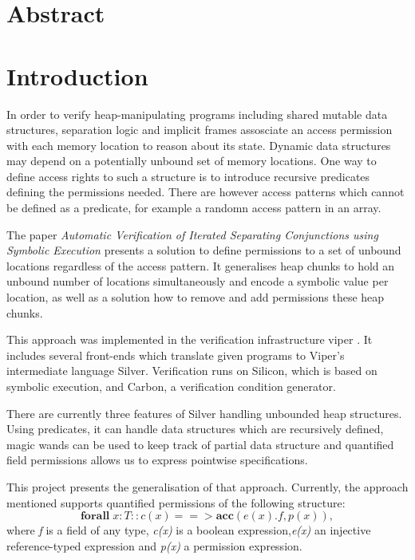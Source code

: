 \documentclass[12pt]{article}
\begin{document}
\maketitle
\newpage
\tableofcontents
\newpage
\section{Abstract}
\section{Introduction}
In order to verify heap-manipulating programs including shared mutable data structures, separation logic\cite{reynolds2002separation} and implicit frames\cite{smans2009implicit} assosciate an access permission with each memory location to reason about its state. 
Dynamic data structures may depend on a potentially unbound set of memory locations. One way to define access rights to such a structure is to introduce recursive predicates defining the permissions needed. There are however access patterns which cannot be defined as a predicate, for example a randomn access pattern in an array.

The paper \textit{Automatic Verification of Iterated Separating Conjunctions using Symbolic Execution}\cite{isc} presents a solution to define permissions to a set of unbound locations regardless of the access pattern. It generalises heap chunks to hold an unbound number of locations simultaneously and encode a symbolic value per location, as well as a solution how to remove and add permissions these heap chunks.

This approach was implemented in the verification infrastructure viper \cite{viper}. It includes several front-ends which translate given programs to Viper's intermediate language Silver. Verification runs on Silicon, which is based on symbolic execution, and Carbon, a verification condition generator.

There are currently three features of Silver handling unbounded heap structures. Using predicates, it can handle data structures which are recursively defined, magic wands \cite{magicwand} can be used to keep track of partial data structure and quantified field permissions \cite{isc} allows us to express pointwise specifications. 

This project presents the generalisation of that approach. Currently, the approach mentioned supports quantified permissions of the following structure:
\begin{equation}
	\mathbf{forall} \; x:T :: c(x) ==>\mathbf{acc}( e(x).f, p(x) ) ,
\end{equation}
where {\it f} is a field of any type, {\it c(x)} is  a boolean expression,{\it e(x)} an injective reference-typed expression and {\it p(x)} a permission expression.
\end{document}
